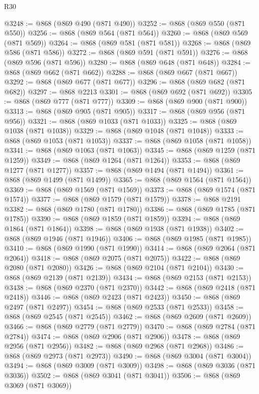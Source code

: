 \begin{lexlean}{R30}
\begin{coremodule}
@3248 := @868 (@869 @490 (@871 @490))
@3252 := @868 (@869 @550 (@871 @550))
@3256 := @868 (@869 @564 (@871 @564))
@3260 := @868 (@869 @569 (@871 @569))
@3264 := @868 (@869 @581 (@871 @581))
@3268 := @868 (@869 @586 (@871 @586))
@3272 := @868 (@869 @591 (@871 @591))
@3276 := @868 (@869 @596 (@871 @596))
@3280 := @868 (@869 @648 (@871 @648))
@3284 := @868 (@869 @662 (@871 @662))
@3288 := @868 (@869 @667 (@871 @667))
@3292 := @868 (@869 @677 (@871 @677))
@3296 := @868 (@869 @682 (@871 @682))
@3297 := @868 @2213
@3301 := @868 (@869 @692 (@871 @692))
@3305 := @868 (@869 @777 (@871 @777))
@3309 := @868 (@869 @900 (@871 @900))
@3313 := @868 (@869 @905 (@871 @905))
@3317 := @868 (@869 @956 (@871 @956))
@3321 := @868 (@869 @1033 (@871 @1033))
@3325 := @868 (@869 @1038 (@871 @1038))
@3329 := @868 (@869 @1048 (@871 @1048))
@3333 := @868 (@869 @1053 (@871 @1053))
@3337 := @868 (@869 @1058 (@871 @1058))
@3341 := @868 (@869 @1063 (@871 @1063))
@3345 := @868 (@869 @1259 (@871 @1259))
@3349 := @868 (@869 @1264 (@871 @1264))
@3353 := @868 (@869 @1277 (@871 @1277))
@3357 := @868 (@869 @1494 (@871 @1494))
@3361 := @868 (@869 @1499 (@871 @1499))
@3365 := @868 (@869 @1564 (@871 @1564))
@3369 := @868 (@869 @1569 (@871 @1569))
@3373 := @868 (@869 @1574 (@871 @1574))
@3377 := @868 (@869 @1579 (@871 @1579))
@3378 := @868 @2191
@3382 := @868 (@869 @1780 (@871 @1780))
@3386 := @868 (@869 @1785 (@871 @1785))
@3390 := @868 (@869 @1859 (@871 @1859))
@3394 := @868 (@869 @1864 (@871 @1864))
@3398 := @868 (@869 @1938 (@871 @1938))
@3402 := @868 (@869 @1946 (@871 @1946))
@3406 := @868 (@869 @1985 (@871 @1985))
@3410 := @868 (@869 @1990 (@871 @1990))
@3414 := @868 (@869 @2064 (@871 @2064))
@3418 := @868 (@869 @2075 (@871 @2075))
@3422 := @868 (@869 @2080 (@871 @2080))
@3426 := @868 (@869 @2104 (@871 @2104))
@3430 := @868 (@869 @2139 (@871 @2139))
@3434 := @868 (@869 @2153 (@871 @2153))
@3438 := @868 (@869 @2370 (@871 @2370))
@3442 := @868 (@869 @2418 (@871 @2418))
@3446 := @868 (@869 @2423 (@871 @2423))
@3450 := @868 (@869 @2497 (@871 @2497))
@3454 := @868 (@869 @2533 (@871 @2533))
@3458 := @868 (@869 @2545 (@871 @2545))
@3462 := @868 (@869 @2609 (@871 @2609))
@3466 := @868 (@869 @2779 (@871 @2779))
@3470 := @868 (@869 @2784 (@871 @2784))
@3474 := @868 (@869 @2906 (@871 @2906))
@3478 := @868 (@869 @2956 (@871 @2956))
@3482 := @868 (@869 @2968 (@871 @2968))
@3486 := @868 (@869 @2973 (@871 @2973))
@3490 := @868 (@869 @3004 (@871 @3004))
@3494 := @868 (@869 @3009 (@871 @3009))
@3498 := @868 (@869 @3036 (@871 @3036))
@3502 := @868 (@869 @3041 (@871 @3041))
@3506 := @868 (@869 @3069 (@871 @3069))

\end{coremodule}
\end{lexlean}
